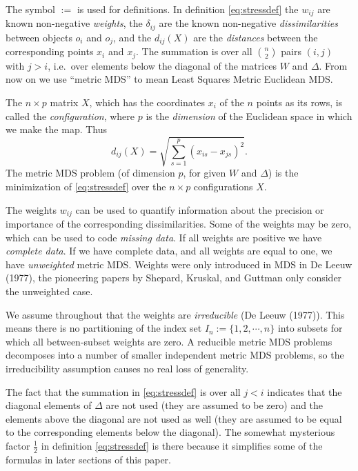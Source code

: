 \documentclass[
  12pt,
]{article}
\begin{document}
The symbol \(:=\) is used for definitions. In definition
\eqref{eq:stressdef} the \(w_{ij}\) are known non-negative \emph{weights}, the \(\delta_{ij}\) are the known non-negative \emph{dissimilarities} between objects \(o_i\) and \(o_j\), and the
\(d_{ij}(X)\) are the \emph{distances} between the corresponding points \(x_i\)
and \(x_j\). The summation is over all \(\binom{n}{2}\) pairs \((i,j)\) with \(j>i\), i.e.~over elements below the diagonal of the matrices \(W\) and \(\Delta\).
From now on we use ``metric MDS'' to mean Least Squares Metric Euclidean MDS.

The \(n\times p\) matrix \(X\), which has the coordinates \(x_i\)
of the \(n\) points as its rows, is called the \emph{configuration}, where
\(p\) is the \emph{dimension} of the Euclidean space in which we make the
map. Thus
\begin{equation}
d_{ij}(X)=\sqrt{\sum_{s=1}^p(x_{is}-x_{js})^2}.
\label{eq:ddef}
\end{equation}
The metric MDS problem (of dimension \(p\), for given \(W\) and \(\Delta\))
is the minimization of \eqref{eq:stressdef} over the \(n\times p\)
configurations \(X\).

The weights \(w_{ij}\) can be used to quantify information about the
precision or importance of the corresponding dissimilarities. Some of the weights may be zero, which can be used to code \emph{missing data}. If all weights are positive we have \emph{complete data}. If we have complete data, and all weights are equal to one, we have \emph{unweighted} metric MDS. Weights were only introduced in MDS in De Leeuw (1977), the pioneering papers by Shepard, Kruskal, and Guttman only consider the unweighted case.

We assume
throughout that the weights are \emph{irreducible} (De Leeuw (1977)). This means there
is no partitioning of the index set \(I_n:=\{1,2,\cdots,n\}\)
into subsets for which all between-subset weights are zero. A reducible
metric MDS problems decomposes into a number of smaller independent
metric MDS problems, so the irreducibility assumption causes no real
loss of generality.

The fact that the summation in \eqref{eq:stressdef} is over all \(j<i\)
indicates that the diagonal elements of \(\Delta\) are not used (they are
assumed to be zero) and the elements above the diagonal are not used as
well (they are assumed to be equal to the corresponding elements below
the diagonal). The somewhat mysterious factor \(\frac12\) in definition
\eqref{eq:stressdef} is there because it simplifies some of the formulas in
later sections of this paper.
\end{document}
